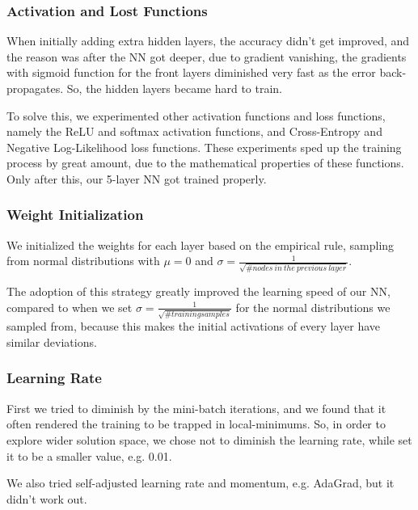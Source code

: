 \documentclass{article} %
\begin{document}
\subsubsection{Activation and Lost Functions}
When initially adding extra hidden layers, the accuracy didn't get improved, and the reason was after the NN got deeper, due to gradient vanishing, the gradients with sigmoid function for the front layers diminished very fast as the error back-propagates. So, the hidden layers became hard to train.

To solve this, we experimented other activation functions and loss functions, namely the ReLU and softmax activation functions, and Cross-Entropy and Negative Log-Likelihood loss functions. These experiments sped up the training process by great amount, due to the mathematical properties of these functions. Only after this, our 5-layer NN got trained properly.

\subsubsection{Weight Initialization}
We initialized the weights for each layer based on the empirical rule\cite{cs231ninit}, sampling from normal distributions with $\mu=0$ and $\sigma=\frac{1}{\sqrt{\# nodes~in~the~previous~layer}}$.

The adoption of this strategy greatly improved the learning speed of our NN, compared to when we set $\sigma=\frac{1}{\sqrt{\# training samples}}$ for the normal distributions we sampled from, because this makes the initial activations of every layer have similar deviations.

\subsubsection{Learning Rate}
First we tried to diminish by the mini-batch iterations, and we found that it often rendered the training to be trapped in local-minimums. So, in order to explore wider solution space, we chose not to diminish the learning rate, while set it to be a smaller value, e.g. 0.01.

We also tried self-adjusted learning rate and momentum, e.g. AdaGrad, but it didn't work out.
\end{document}
